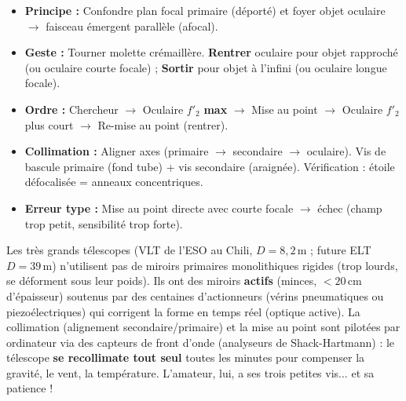 \documentclass[11pt]{article}
\begin{document}
\begin{aretenir}
\begin{itemize}
    \item \textbf{Principe :} Confondre plan focal primaire (déporté) et foyer objet oculaire $\rightarrow$ faisceau émergent parallèle (afocal).
    \item \textbf{Geste :} Tourner molette crémaillère. \textbf{Rentrer} oculaire pour objet rapproché (ou oculaire courte focale) ; \textbf{Sortir} pour objet à l'infini (ou oculaire longue focale).
    \item \textbf{Ordre :} Chercheur $\rightarrow$ Oculaire $f'_2$ \textbf{max} $\rightarrow$ Mise au point $\rightarrow$ Oculaire $f'_2$ plus court $\rightarrow$ Re-mise au point (rentrer).
    \item \textbf{Collimation :} Aligner axes (primaire $\rightarrow$ secondaire $\rightarrow$ oculaire). Vis de bascule primaire (fond tube) + vis secondaire (araignée). Vérification : étoile défocalisée = anneaux concentriques.
    \item \textbf{Erreur type :} Mise au point directe avec courte focale $\rightarrow$ échec (champ trop petit, sensibilité trop forte).
\end{itemize}
\end{aretenir}

\begin{savaistu}
Les très grands télescopes (VLT de l'ESO au Chili, $D=8,2\,\text{m}$ ; future ELT $D=39\,\text{m}$) n'utilisent pas de miroirs primaires monolithiques rigides (trop lourds, se déforment sous leur poids). Ils ont des miroirs \textbf{actifs} (minces, $< 20\,\text{cm}$ d'épaisseur) soutenus par des centaines d'actionneurs (vérins pneumatiques ou piezoélectriques) qui corrigent la forme en temps réel (optique active). La collimation (alignement secondaire/primaire) et la mise au point sont pilotées par ordinateur via des capteurs de front d'onde (analyseurs de Shack-Hartmann) : le télescope \textbf{se recollimate tout seul} toutes les minutes pour compenser la gravité, le vent, la température. L'amateur, lui, a ses trois petites vis... et sa patience !
\end{savaistu}
\end{document}
